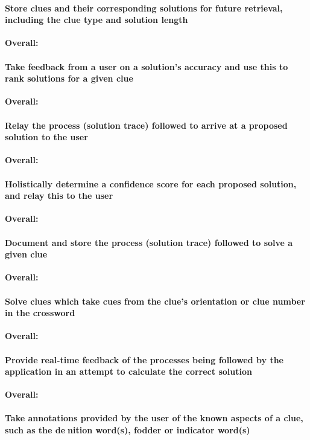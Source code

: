 \paragraph{Store clues and their corresponding solutions for future
retrieval, including the clue type and solution length}

{\bf Overall:}

\paragraph{Take feedback from a user on a solution's accuracy and
use this to rank solutions for a given clue}

{\bf Overall:}

\paragraph{Relay the process (solution trace) followed to arrive at
a proposed solution to the user}

{\bf Overall:}

\paragraph{Holistically determine a confidence score for each proposed 
solution, and relay this to the user}

{\bf Overall:}

\paragraph{Document and store the process (solution trace) followed to solve a given clue}

{\bf Overall:}

\paragraph{Solve clues which take cues from the clue's orientation
or clue number in the crossword}

{\bf Overall:}

\paragraph{Provide real-time feedback of the processes being followed 
by the application in an attempt to calculate the
correct solution}

{\bf Overall:}

\paragraph{Take annotations provided by the user of the known
aspects of a clue, such as the denition word(s), fodder
or indicator word(s)}

